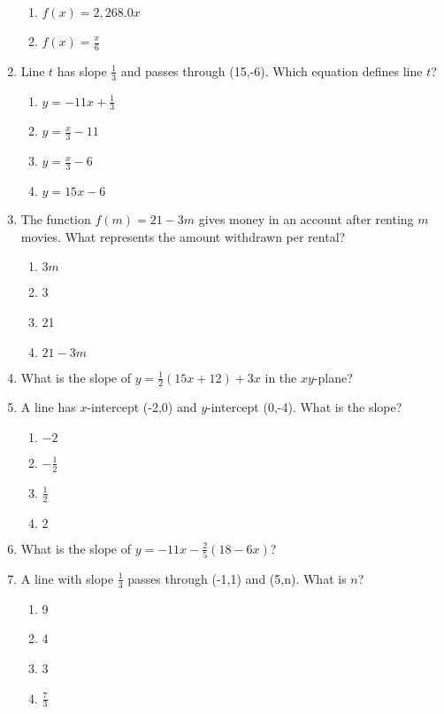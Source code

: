 \documentclass[12pt]{exam}
\begin{document}
\begin{enumerate}
\begin{enumerate}[label=\Alph*)]
        \item $f(x) = 2,268.0x$
        \item $f(x) = \frac{x}{6}$
    \end{enumerate}
    \item Line $t$ has slope $\frac{1}{3}$ and passes through (15,-6). Which equation defines line $t$?
    \begin{enumerate}[label=\Alph*)]
        \item $y = -11x + \frac{1}{3}$
        \item $y = \frac{x}{3} - 11$
        \item $y = \frac{x}{3} - 6$
        \item $y = 15x - 6$
    \end{enumerate}
    \item The function $f(m) = 21 - 3m$ gives money in an account after renting $m$ movies. What represents the amount withdrawn per rental?
    \begin{enumerate}[label=\Alph*)]
        \item $3m$
        \item 3
        \item 21
        \item $21 - 3m$
    \end{enumerate}
    \item What is the slope of $y = \frac{1}{2}(15x + 12) + 3x$ in the $xy$-plane?
    \item A line has $x$-intercept (-2,0) and $y$-intercept (0,-4). What is the slope?
    \begin{enumerate}[label=\Alph*)]
        \item $-2$
        \item $-\frac{1}{2}$
        \item $\frac{1}{2}$
        \item $2$
    \end{enumerate}
    \item What is the slope of $y = -11x - \frac{2}{5}(18 - 6x)$?
    \item A line with slope $\frac{1}{3}$ passes through (-1,1) and (5,n). What is $n$?
    \begin{enumerate}[label=\Alph*)]
        \item 9
        \item 4
        \item 3
        \item $\frac{7}{3}$

\end{enumerate}
\end{enumerate}
\end{document}
